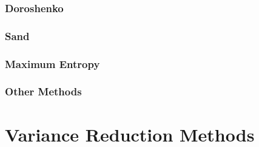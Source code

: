 






\subsubsection{Doroshenko}



\subsubsection{Sand}


\subsubsection{Maximum Entropy}



\subsubsection{Other Methods}


\section{Variance Reduction Methods}

